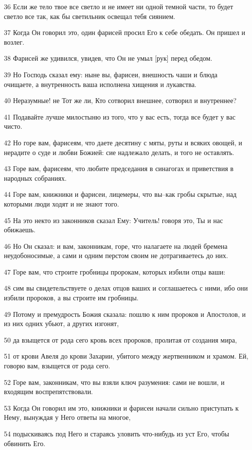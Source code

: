 \par 36 Если же тело твое все светло и не имеет ни одной темной части, то будет светло все так, как бы светильник освещал тебя сиянием.
\par 37 Когда Он говорил это, один фарисей просил Его к себе обедать. Он пришел и возлег.
\par 38 Фарисей же удивился, увидев, что Он не умыл [рук] перед обедом.
\par 39 Но Господь сказал ему: ныне вы, фарисеи, внешность чаши и блюда очищаете, а внутренность ваша исполнена хищения и лукавства.
\par 40 Неразумные! не Тот же ли, Кто сотворил внешнее, сотворил и внутреннее?
\par 41 Подавайте лучше милостыню из того, что у вас есть, тогда все будет у вас чисто.
\par 42 Но горе вам, фарисеям, что даете десятину с мяты, руты и всяких овощей, и нерадите о суде и любви Божией: сие надлежало делать, и того не оставлять.
\par 43 Горе вам, фарисеям, что любите председания в синагогах и приветствия в народных собраниях.
\par 44 Горе вам, книжники и фарисеи, лицемеры, что вы--как гробы скрытые, над которыми люди ходят и не знают того.
\par 45 На это некто из законников сказал Ему: Учитель! говоря это, Ты и нас обижаешь.
\par 46 Но Он сказал: и вам, законникам, горе, что налагаете на людей бремена неудобоносимые, а сами и одним перстом своим не дотрагиваетесь до них.
\par 47 Горе вам, что строите гробницы пророкам, которых избили отцы ваши:
\par 48 сим вы свидетельствуете о делах отцов ваших и соглашаетесь с ними, ибо они избили пророков, а вы строите им гробницы.
\par 49 Потому и премудрость Божия сказала: пошлю к ним пророков и Апостолов, и из них одних убьют, а других изгонят,
\par 50 да взыщется от рода сего кровь всех пророков, пролитая от создания мира,
\par 51 от крови Авеля до крови Захарии, убитого между жертвенником и храмом. Ей, говорю вам, взыщется от рода сего.
\par 52 Горе вам, законникам, что вы взяли ключ разумения: сами не вошли, и входящим воспрепятствовали.
\par 53 Когда Он говорил им это, книжники и фарисеи начали сильно приступать к Нему, вынуждая у Него ответы на многое,
\par 54 подыскиваясь под Него и стараясь уловить что-нибудь из уст Его, чтобы обвинить Его.

